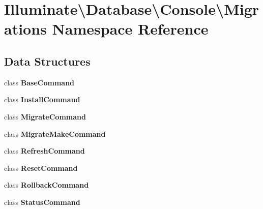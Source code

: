 \section{Illuminate\textbackslash{}Database\textbackslash{}Console\textbackslash{}Migrations Namespace Reference}
\label{namespace_illuminate_1_1_database_1_1_console_1_1_migrations}
\subsection*{Data Structures}
\begin{DoxyCompactItemize}
\item 
class {\bf Base\+Command}
\item 
class {\bf Install\+Command}
\item 
class {\bf Migrate\+Command}
\item 
class {\bf Migrate\+Make\+Command}
\item 
class {\bf Refresh\+Command}
\item 
class {\bf Reset\+Command}
\item 
class {\bf Rollback\+Command}
\item 
class {\bf Status\+Command}
\end{DoxyCompactItemize}
